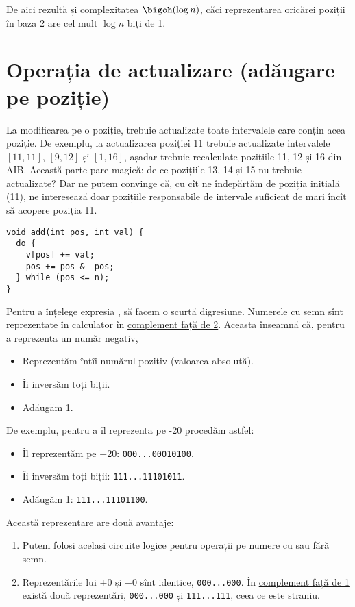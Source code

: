 De aici rezultă și complexitatea $\bigoh(\log n)$, căci reprezentarea oricărei poziții în baza 2 are cel mult $\log n$ biți de 1.

\section{Operația de actualizare (adăugare pe poziție)}

La modificarea pe o poziție, trebuie actualizate toate intervalele care conțin acea poziție. De exemplu, la actualizarea poziției 11 trebuie actualizate intervalele $[11, 11]$, $[9, 12]$ și $[1, 16]$, așadar trebuie recalculate pozițiile 11, 12 și 16 din AIB. Această parte pare magică: de ce pozițiile 13, 14 și 15 nu trebuie actualizate? Dar ne putem convinge că, cu cît ne îndepărtăm de poziția inițială (11), ne interesează doar pozițiile responsabile de intervale suficient de mari încît să acopere poziția 11.

\begin{verbatim}
void add(int pos, int val) {
  do {
    v[pos] += val;
    pos += pos & -pos;
  } while (pos <= n);
}
\end{verbatim}

Pentru a înțelege expresia , să facem o scurtă digresiune. Numerele cu semn sînt reprezentate în calculator în \href{https://en.wikipedia.org/wiki/Two\%27s_complement}{complement față de 2}. Aceasta înseamnă că, pentru a reprezenta un număr negativ,

\begin{itemize}
  \item Reprezentăm întîi numărul pozitiv (valoarea absolută).
  \item Îi inversăm toți biții.
  \item Adăugăm 1.
\end{itemize}

De exemplu, pentru a îl reprezenta pe -20 procedăm astfel:

\begin{itemize}
  \item Îl reprezentăm pe +20: \texttt{000...00010100}.
  \item Îi inversăm toți biții: \texttt{111...11101011}.
  \item Adăugăm 1: \texttt{111...11101100}.
\end{itemize}

Această reprezentare are două avantaje:

\begin{enumerate}
  \item Putem folosi același circuite logice pentru operații pe numere cu sau fără semn.
  \item Reprezentările lui $+0$ și $-0$ sînt identice, \texttt{000...000}. În \href{https://en.wikipedia.org/wiki/Ones\%27_complement}{complement față de 1} există două reprezentări, \texttt{000...000} și \texttt{111...111}, ceea ce este straniu.
\end{enumerate}

